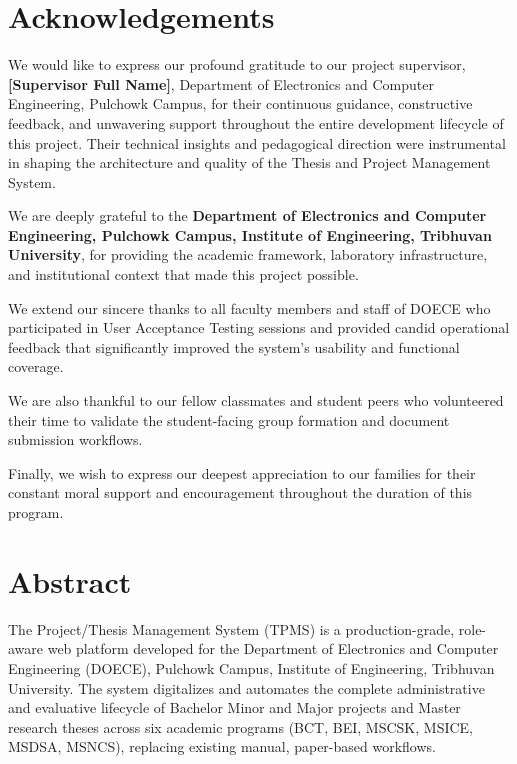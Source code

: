 \documentclass[12pt]{report}
\begin{document}
\chapter*{Acknowledgements}
We would like to express our profound gratitude to our project supervisor, \textbf{[Supervisor Full Name]}, Department of Electronics and Computer Engineering, Pulchowk Campus, for their continuous guidance, constructive feedback, and unwavering support throughout the entire development lifecycle of this project. Their technical insights and pedagogical direction were instrumental in shaping the architecture and quality of the Thesis and Project Management System.

We are deeply grateful to the \textbf{Department of Electronics and Computer Engineering, Pulchowk Campus, Institute of Engineering, Tribhuvan University}, for providing the academic framework, laboratory infrastructure, and institutional context that made this project possible.

We extend our sincere thanks to all faculty members and staff of DOECE who participated in User Acceptance Testing sessions and provided candid operational feedback that significantly improved the system's usability and functional coverage.

We are also thankful to our fellow classmates and student peers who volunteered their time to validate the student-facing group formation and document submission workflows.

Finally, we wish to express our deepest appreciation to our families for their constant moral support and encouragement throughout the duration of this program.

\chapter*{Abstract}
The Project/Thesis Management System (TPMS) is a production-grade, role-aware web platform developed for the Department of Electronics and Computer Engineering (DOECE), Pulchowk Campus, Institute of Engineering, Tribhuvan University. The system digitalizes and automates the complete administrative and evaluative lifecycle of Bachelor Minor and Major projects and Master research theses across six academic programs (BCT, BEI, MSCSK, MSICE, MSDSA, MSNCS), replacing existing manual, paper-based workflows.
\end{document}
